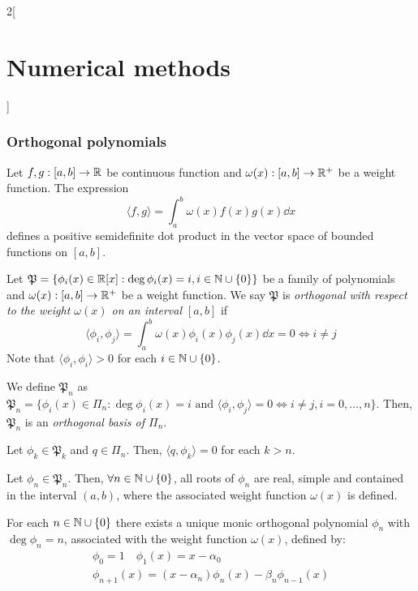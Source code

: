 \documentclass[../../../main.tex]{subfiles}
\begin{document}
\begin{multicols}{2}[\section{Numerical methods}]
    \subsubsection*{Orthogonal polynomials}
    \begin{definition}
        Let $f,g:[a,b]\rightarrow\mathbb{R}$ be continuous function and $\omega(x):[a,b]\rightarrow\mathbb{R}^+$ be a weight function. The expression $$\langle f,g\rangle=\int_a^b\omega(x)f(x)g(x)\dd x$$ defines a positive semidefinite dot product in the vector space of bounded functions on $[a,b]$.
    \end{definition}
    \begin{definition}
        Let $\mathfrak{P}=\{\phi_i(x)\in\mathbb{R}[x]:\deg \phi_i(x)=i, i\in\mathbb{N}\cup\{0\}\}$ be a family of polynomials and $\omega(x):[a,b]\rightarrow\mathbb{R}^+$ be a weight function. We say $\mathfrak{P}$ is \textit{orthogonal with respect to the weight $\omega(x)$ on an interval $[a,b]$} if $$\langle \phi_i,\phi_j\rangle=\int_a^b\omega(x)\phi_i(x)\phi_j(x)\dd x=0\iff i\ne j$$
        Note that $\langle \phi_i,\phi_i\rangle>0$ for each $i\in\mathbb{N}\cup\{0\}$.
    \end{definition}
    \begin{lemma}
        We define $\mathfrak{P}_n$ as $\mathfrak{P}_n=\{\phi_i(x)\in\Pi_n:\deg\phi_i(x)=i\text{ and }\langle \phi_i,\phi_j\rangle=0\iff i\ne j,  i=0,\ldots,n\}$. Then, $\mathfrak{P}_n$ is an \textit{orthogonal basis of $\Pi_n$}.
    \end{lemma}
    \begin{lemma}
        Let $\phi_k\in\mathfrak{P}_k$ and $q\in\Pi_n$. Then, $\langle q,\phi_k\rangle=0$ for each $k>n$.
    \end{lemma}
    \begin{lemma}
        Let $\phi_n\in\mathfrak{P}_n$. Then, $\forall n\in\mathbb{N}\cup\{0\}$, all roots of $\phi_n$ are real, simple and contained in the interval $(a,b)$, where the associated weight function $\omega(x)$ is defined.
    \end{lemma}
    \begin{theorem}
        For each $n\in\mathbb{N}\cup\{0\}$ there exists a unique monic orthogonal polynomial $\phi_n$ with $\deg\phi_n=n$, associated with the weight function $\omega(x)$, defined by:
        \begin{gather*}
            \phi_0=1\quad\phi_1(x)=x-\alpha_0\\
            \phi_{n+1}(x)=(x-\alpha_n)\phi_n(x)-\beta_n\phi_{n-1}(x)
        \end{gather*}

\end{theorem}
\end{multicols}
\end{document}
